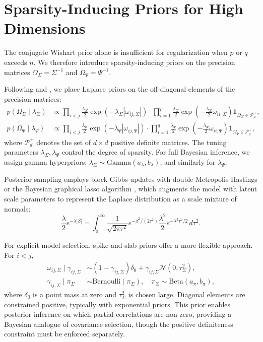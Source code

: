\documentclass[twoside]{article}
\begin{document}
\section{Sparsity-Inducing Priors for High Dimensions}

The conjugate Wishart prior alone is insufficient for regularization when $p$ or $q$ exceeds $n$. We therefore introduce sparsity-inducing priors on the precision matrices $\Omega_\Sigma = \Sigma^{-1}$ and $\Omega_\Psi = \Psi^{-1}$.

\noindent  Following \cite{Wang2012} and \cite{Petersen2019}, we place Laplace priors on the off-diagonal elements of the precision matrices:
\begin{align*}
p(\Omega_\Sigma \mid \lambda_\Sigma) &\propto \prod_{i<j} \frac{\lambda_\Sigma}{2} \exp(-\lambda_\Sigma |\omega_{ij,\Sigma}|) \cdot \prod_{i=1}^p \frac{\lambda_\Sigma}{2} \exp\left(-\frac{\lambda_\Sigma}{2} \omega_{ii,\Sigma}\right) \mathbf{1}_{\Omega_\Sigma \in \mathcal{P}^+_p},\\
p(\Omega_\Psi \mid \lambda_\Psi) &\propto \prod_{i<j} \frac{\lambda_\Psi}{2} \exp(-\lambda_\Psi |\omega_{ij,\Psi}|) \cdot \prod_{i=1}^q \frac{\lambda_\Psi}{2} \exp\left(-\frac{\lambda_\Psi}{2} \omega_{ii,\Psi}\right) \mathbf{1}_{\Omega_\Psi \in \mathcal{P}^+_q},
\end{align*}
where $\mathcal{P}^+_d$ denotes the set of $d \times d$ positive definite matrices. The tuning parameters $\lambda_\Sigma, \lambda_\Psi$ control the degree of sparsity. For full Bayesian inference, we assign gamma hyperpriors: $\lambda_\Sigma \sim \text{Gamma}(a_\lambda, b_\lambda)$, and similarly for $\lambda_\Psi$.

Posterior sampling employs block Gibbs updates with double Metropolis-Hastings or the Bayesian graphical lasso algorithm \cite{Wang2012}, which augments the model with latent scale parameters to represent the Laplace distribution as a scale mixture of normals:
\begin{equation*}
\frac{\lambda}{2} e^{-\lambda |\beta|} = \int_0^\infty \frac{1}{\sqrt{2\pi \tau^2}} e^{-\beta^2/(2\tau^2)} \frac{\lambda^2}{2} e^{-\lambda^2 \tau^2/2} \, d\tau^2.
\end{equation*}

For explicit model selection, spike-and-slab priors offer a more flexible approach. For $i < j$,
\begin{align*}
\omega_{ij,\Sigma} \mid \gamma_{ij,\Sigma} &\sim (1-\gamma_{ij,\Sigma}) \delta_0 + \gamma_{ij,\Sigma} \mathcal{N}(0, \tau^2_\Sigma),\\
\gamma_{ij,\Sigma} \mid \pi_\Sigma &\sim \text{Bernoulli}(\pi_\Sigma), \quad \pi_\Sigma \sim \text{Beta}(a_\pi, b_\pi),
\end{align*}
where $\delta_0$ is a point mass at zero and $\tau^2_\Sigma$ is chosen large. Diagonal elements are constrained positive, typically with exponential priors. This prior enables posterior inference on which partial correlations are non-zero, providing a Bayesian analogue of covariance selection, though the positive definiteness constraint must be enforced separately.
\end{document}
